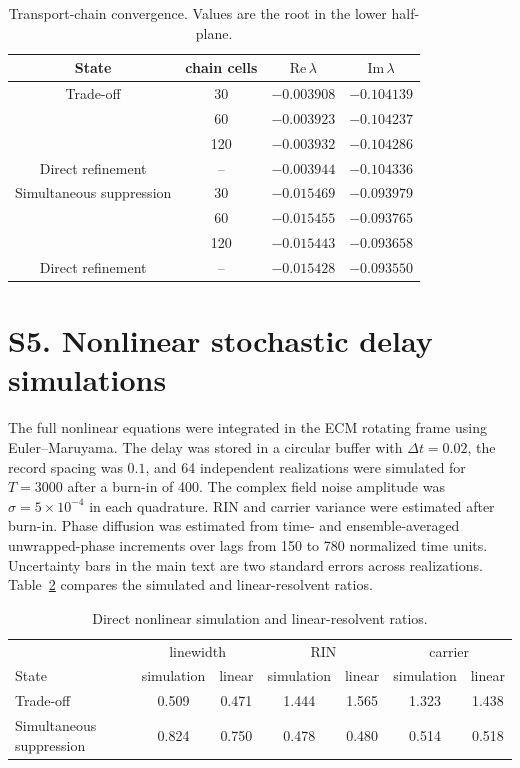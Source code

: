 \documentclass[11pt]{article}
\begin{document}
\begin{table}[h]
\centering
\caption{Transport-chain convergence. Values are the root in the lower half-plane.}\label{tab:chain}
\begin{tabular}{cccc}
\toprule
State & chain cells & $\mathrm{Re}\,\lambda$ & $\mathrm{Im}\,\lambda$\\
\midrule
Trade-off & 30 & $-0.003908$ & $-0.104139$\\
& 60 & $-0.003923$ & $-0.104237$\\
& 120 & $-0.003932$ & $-0.104286$\\
Direct refinement & -- & $-0.003944$ & $-0.104336$\\
\midrule
Simultaneous suppression & 30 & $-0.015469$ & $-0.093979$\\
& 60 & $-0.015455$ & $-0.093765$\\
& 120 & $-0.015443$ & $-0.093658$\\
Direct refinement & -- & $-0.015428$ & $-0.093550$\\
\bottomrule
\end{tabular}
\end{table}

\section*{S5. Nonlinear stochastic delay simulations}

The full nonlinear equations were integrated in the ECM rotating frame using Euler--Maruyama. The delay was stored in a circular buffer with $\Delta t=0.02$, the record spacing was $0.1$, and 64 independent realizations were simulated for $T=3000$ after a burn-in of 400. The complex field noise amplitude was $\sigma=5\times10^{-4}$ in each quadrature. RIN and carrier variance were estimated after burn-in. Phase diffusion was estimated from time- and ensemble-averaged unwrapped-phase increments over lags from 150 to 780 normalized time units. Uncertainty bars in the main text are two standard errors across realizations. Table~\ref{tab:sde} compares the simulated and linear-resolvent ratios.

\begin{table}[h]
\centering
\caption{Direct nonlinear simulation and linear-resolvent ratios.}\label{tab:sde}
\begin{tabular}{lcccccc}
\toprule
& \multicolumn{2}{c}{linewidth} & \multicolumn{2}{c}{RIN} & \multicolumn{2}{c}{carrier}\\
State & simulation & linear & simulation & linear & simulation & linear\\
\midrule
Trade-off & 0.509 & 0.471 & 1.444 & 1.565 & 1.323 & 1.438\\
Simultaneous suppression & 0.824 & 0.750 & 0.478 & 0.480 & 0.514 & 0.518\\
\bottomrule
\end{tabular}
\end{table}
\end{document}
